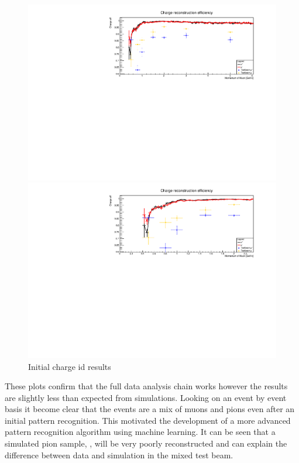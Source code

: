 \begin{figure}[h!]
\centering
\includegraphics[width=\textwidth]{figures/testbeam/TestBeam090318Plots/ChargeIDFull6GeV.pdf}

\includegraphics[width=\textwidth]{figures/testbeam/TestBeam090318Plots/ChargeIDFullLow.pdf}


\caption{Initial charge id results}
\label{fig:ChargeInitial}
\end{figure}

These plots confirm that the full data analysis chain works however the results are slightly less than expected from simulations. Looking on an event by event basis it become clear that the events are a mix of muons and pions even after an initial pattern recognition. This motivated the development of a more advanced pattern recognition algorithm using machine learning. It can be seen that a simulated pion sample, , will be very poorly reconstructed and can explain the difference between data and simulation in the mixed test beam.

